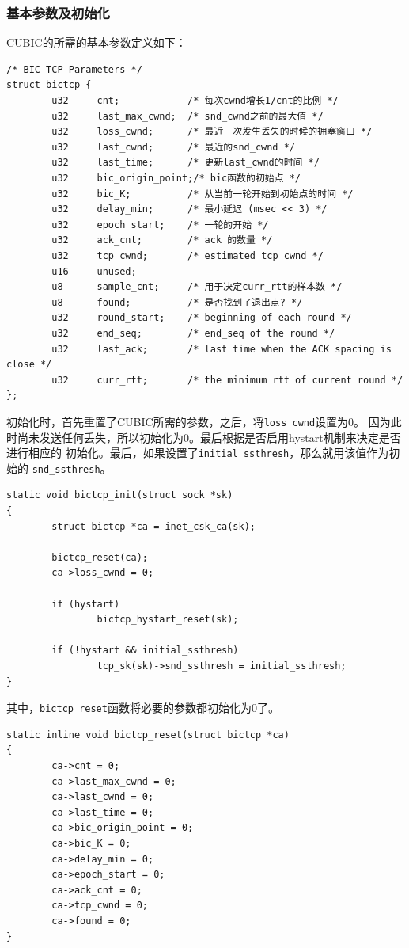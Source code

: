 \subsubsection{基本参数及初始化}
CUBIC的所需的基本参数定义如下：
\begin{verbatim}
/* BIC TCP Parameters */
struct bictcp {
        u32     cnt;            /* 每次cwnd增长1/cnt的比例 */
        u32     last_max_cwnd;  /* snd_cwnd之前的最大值 */
        u32     loss_cwnd;      /* 最近一次发生丢失的时候的拥塞窗口 */
        u32     last_cwnd;      /* 最近的snd_cwnd */
        u32     last_time;      /* 更新last_cwnd的时间 */
        u32     bic_origin_point;/* bic函数的初始点 */
        u32     bic_K;          /* 从当前一轮开始到初始点的时间 */
        u32     delay_min;      /* 最小延迟 (msec << 3) */
        u32     epoch_start;    /* 一轮的开始 */
        u32     ack_cnt;        /* ack 的数量 */
        u32     tcp_cwnd;       /* estimated tcp cwnd */
        u16     unused;
        u8      sample_cnt;     /* 用于决定curr_rtt的样本数 */
        u8      found;          /* 是否找到了退出点? */
        u32     round_start;    /* beginning of each round */
        u32     end_seq;        /* end_seq of the round */
        u32     last_ack;       /* last time when the ACK spacing is close */
        u32     curr_rtt;       /* the minimum rtt of current round */
};
\end{verbatim}

初始化时，首先重置了CUBIC所需的参数，之后，将\texttt{loss_cwnd}设置为0。
因为此时尚未发送任何丢失，所以初始化为0。最后根据是否启用hystart机制来决定是否进行相应的
初始化。最后，如果设置了\texttt{initial_ssthresh}，那么就用该值作为初始的
\texttt{snd_ssthresh}。
\begin{verbatim}
static void bictcp_init(struct sock *sk)
{
        struct bictcp *ca = inet_csk_ca(sk);

        bictcp_reset(ca);
        ca->loss_cwnd = 0;

        if (hystart)
                bictcp_hystart_reset(sk);

        if (!hystart && initial_ssthresh)
                tcp_sk(sk)->snd_ssthresh = initial_ssthresh;
}
\end{verbatim}
其中，\texttt{bictcp_reset}函数将必要的参数都初始化为0了。
\begin{verbatim}
static inline void bictcp_reset(struct bictcp *ca)
{
        ca->cnt = 0;
        ca->last_max_cwnd = 0;
        ca->last_cwnd = 0;
        ca->last_time = 0;
        ca->bic_origin_point = 0;
        ca->bic_K = 0;
        ca->delay_min = 0;
        ca->epoch_start = 0;
        ca->ack_cnt = 0;
        ca->tcp_cwnd = 0;
        ca->found = 0;
}
\end{verbatim}

